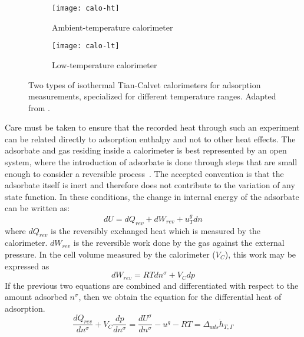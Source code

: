 \begin{figure}[htb]

	\centering
	\begin{subfigure}[b]{.45\textwidth}
		\centering
		\texttt{[image: calo-ht]}
		\caption{Ambient-temperature calorimeter}%
		\label{calo:fig:calo-ht}
	\end{subfigure}
	\begin{subfigure}[b]{.5\textwidth}
		\centering
		\texttt{[image: calo-lt]}
		\caption{Low-temperature calorimeter}%
		\label{calo:fig:calo-lt}
	\end{subfigure}%
	\caption{Two types of isothermal Tian-Calvet calorimeters
		for adsorption measurements, specialized for
		different temperature ranges.
		Adapted from \citet{llewellynGasAdsorptionMicrocalorimetry2005}.
	}%
	\label{calo:fig:calo-types}

\end{figure}

Care must be taken to ensure that
the recorded heat through such an experiment can be related directly
to adsorption enthalpy and not to other heat effects.
The adsorbate and gas residing inside a calorimeter is best
represented by an open system, where the introduction of adsorbate
is done through steps that are small enough to consider a reversible
process~\cite{rouquerolGasSolidInteractions1980}.
The accepted convention is that the adsorbate itself is inert and
therefore does not contribute to the variation of any state function.
In these conditions,
the change in internal energy of the adsorbate can be written as:
%
\begin{equation}
	dU = dQ_{rev} + dW_{rev} + u_T^g dn
\end{equation}
%
where \(dQ_{rev}\) is the reversibly exchanged heat which is
measured by the calorimeter. \(dW_{rev}\) is the reversible work
done by the gas against the external pressure. In the cell volume measured
by the calorimeter (\(V_C\)), this work may be expressed as
%
\begin{equation}
	dW_{rev} = RT dn^{\sigma} + V_C dp
\end{equation}
%
If the previous two equations are combined and differentiated with
respect to the amount adsorbed \(n^{\sigma}\), then we obtain
the equation for the differential heat of adsorption.
%
\begin{equation}
	\frac{dQ_{rev}}{dn^{\sigma}} + V_C \frac{dp}{dn^{\sigma}} = %
	\frac{dU^{\sigma}}{dn^{\sigma}} - u^g - RT = \Delta_{ads}\dot{h}_{T, \Gamma}
\end{equation}

